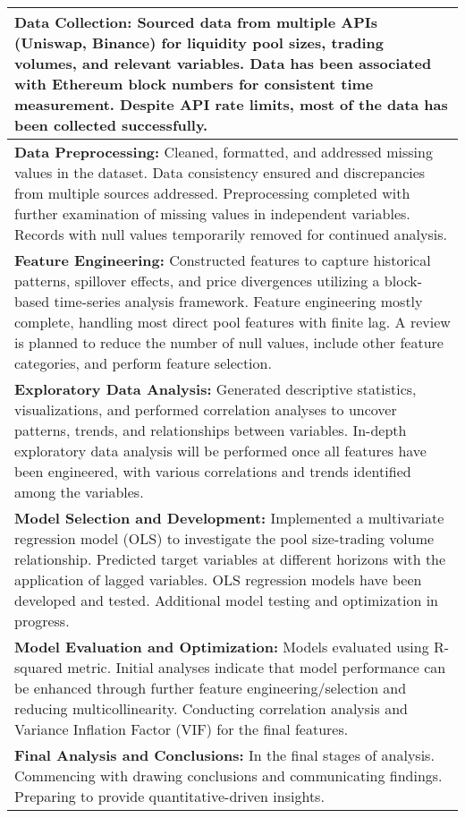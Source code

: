 \documentclass{article}
\begin{document}
{\begin{table}[htbp]
\centering
\small
\begin{tabularx}{\linewidth}{|>{\raggedright\arraybackslash}X|}
\hline
\textbf{Data Collection:} Sourced data from multiple APIs (Uniswap, Binance) for liquidity pool sizes, trading volumes, and relevant variables. Data has been associated with Ethereum block numbers for consistent time measurement. Despite API rate limits, most of the data has been collected successfully. \\
\hline
\textbf{Data Preprocessing:} Cleaned, formatted, and addressed missing values in the dataset. Data consistency ensured and discrepancies from multiple sources addressed. Preprocessing completed with further examination of missing values in independent variables. Records with null values temporarily removed for continued analysis. \\
\hline
\textbf{Feature Engineering:} Constructed features to capture historical patterns, spillover effects, and price divergences utilizing a block-based time-series analysis framework. Feature engineering mostly complete, handling most direct pool features with finite lag. A review is planned to reduce the number of null values, include other feature categories, and perform feature selection. \\
\hline
\textbf{Exploratory Data Analysis:} Generated descriptive statistics, visualizations, and performed correlation analyses to uncover patterns, trends, and relationships between variables. In-depth exploratory data analysis will be performed once all features have been engineered, with various correlations and trends identified among the variables. \\
\hline
\textbf{Model Selection and Development:} Implemented a multivariate regression model (OLS) to investigate the pool size-trading volume relationship. Predicted target variables at different horizons with the application of lagged variables. OLS regression models have been developed and tested. Additional model testing and optimization in progress. \\
\hline
\textbf{Model Evaluation and Optimization:} Models evaluated using R-squared metric. Initial analyses indicate that model performance can be enhanced through further feature engineering/selection and reducing multicollinearity. Conducting correlation analysis and Variance Inflation Factor (VIF) for the final features. \\
\hline
\textbf{Final Analysis and Conclusions:} In the final stages of analysis. Commencing with drawing conclusions and communicating findings. Preparing to provide quantitative-driven insights. \\
\hline
\end{tabularx}
\end{table}




}
\end{document}
